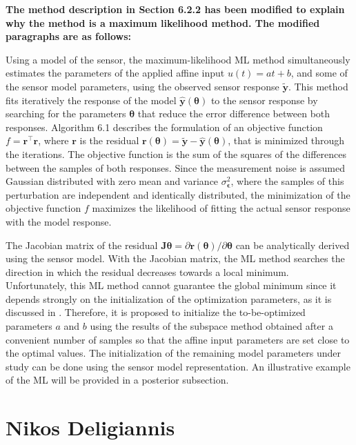 \documentclass[11pt]{article}
\begin{document}
\begin{itemize}
    {\bfseries The method description in Section 6.2.2 has been modified to explain why the method is a maximum likelihood method. The modified paragraphs are as follows: }
    
    \color{blue} 
    Using a model of the sensor, the maximum-likelihood ML method simultaneously estimates the parameters of the applied affine input $u(t) = at + b$, and some of the sensor model parameters, using the observed sensor response $\widetilde{\mathbf{y}}$.
    This method fits iteratively the response of the model $\widehat{\mathbf{y}}(\bm{\theta})$ to the sensor response by searching for the parameters $\bm{\theta}$ that reduce the error difference between both responses.
    Algorithm 6.1 describes the formulation of an objective function $f = \mathbf{r}^\top \mathbf{r}$, where $\mathbf{r}$ is the residual $\mathbf{r}(\bm{\theta}) = \widetilde{\mathbf{y}} - \widehat{\mathbf{y}}(\bm{\theta})$, that is minimized through the iterations.
    The objective function is the sum of the squares of the differences between the samples of both responses.
    Since the measurement noise is assumed Gaussian distributed with zero mean and variance $\sigma_{\bm{\epsilon}}^2$, where the samples of this perturbation are independent and identically distributed, the minimization of the objective function $f$ maximizes the likelihood of fitting the actual sensor response with the model response.


    The Jacobian matrix of the residual $\mathbf{J}\bm{\theta} = \partial \mathbf{r}(\bm{\theta}) / \partial \bm{\theta}$ can be analytically derived using the sensor model.
    With the Jacobian matrix, the ML method searches the direction in which the residual decreases towards a local minimum.
    Unfortunately, this ML method cannot guarantee the global minimum since it depends strongly on the initialization of the optimization parameters, as it is discussed in \cite{Nocedal06}.
    Therefore, it is proposed to initialize the to-be-optimized parameters $a$ and $b$ using the results of the subspace method obtained after a convenient number of samples so that the affine input parameters are set close to the optimal values.
    The initialization of the remaining model parameters under study can be done using the sensor model representation.
    An illustrative example of the ML will be provided in a posterior subsection.  
    \color{black}
\end{itemize}

\section*{Nikos Deligiannis}
\end{document}

